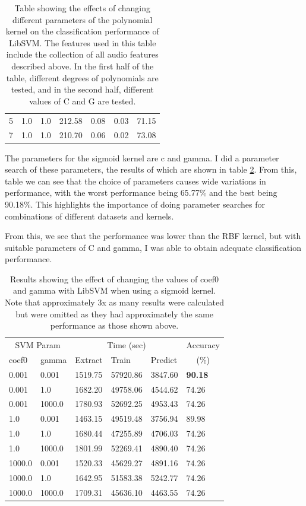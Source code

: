 \begin{table}
\begin{tabular}{|l|l|l|l|l|l|l|}
\hline
5  & 1.0    & 1.0     &  212.58  &  0.08  &  0.03  &  71.15  \\
7  & 1.0    & 1.0     &  210.70  &  0.06  &  0.02  &  73.08  \\
\hline
\end{tabular}
\caption{Table showing the effects of changing
  different parameters of the polynomial kernel on the classification
  performance of LibSVM.  The features used in this table include the
  collection of all audio features described above.  In the first half
  of the table, different degrees of polynomials are tested, and in
  the second half, different values of C and G are tested.}
\label{table:obv-libsvm-poly}
\end{table}

The parameters for the sigmoid kernel are c and gamma.  I did a
parameter search of these parameters, the results of which are shown
in table \ref{table:obv-libsvm-sigmoid}.  From this, table we can see
that the choice of parameters causes wide variations in performance,
with the worst performance being 65.77\% and the best being 90.18\%.
This highlights the importance of doing parameter searches for
combinations of different datasets and kernels.

From this, we see that the performance was lower than the RBF kernel,
but with suitable parameters of C and gamma, I was able to obtain
adequate classification performance.


\begin{table}
\begin{tabular}{|l|l|l|l|l|l|}
\hline
\multicolumn{2}{|c|}{SVM Param} & \multicolumn{3}{c|}{Time (sec)} & Accuracy \\
\hhline{|-|-|-|-|-|~|}
coef0 & gamma & Extract & Train & Predict & \multicolumn{1}{c|}{(\%)} \\
\hhline{|=|=|=|=|=|=|}
0.001  & 0.001   &  1519.75  &   57920.86  &  3847.60  &  \textbf{90.18}  \\
0.001  & 1.0     &  1682.20  &   49758.06  &  4544.62  &  74.26  \\
0.001  & 1000.0  &  1780.93  &   52692.25  &  4953.43  &  74.26  \\
1.0    & 0.001   &  1463.15  &   49519.48  &  3756.94  &  89.98  \\
1.0    & 1.0     &  1680.44  &   47255.89  &  4706.03  &  74.26  \\
1.0    & 1000.0  &  1801.99  &   52269.41  &  4890.40  &  74.26  \\
1000.0 & 0.001   &  1520.33  &   45629.27  &  4891.16  &  74.26  \\
1000.0 & 1.0     &  1642.95  &   51583.38  &  5242.77  &  74.26  \\
1000.0 & 1000.0  &  1709.31  &   45636.10  &  4463.55  &  74.26  \\
\hline
\end{tabular}
\caption{Results showing the effect of changing the values of coef0
  and gamma with LibSVM when using a sigmoid kernel. Note that
  approximately 3x as many results were calculated but were omitted as
  they had approximately the same performance as those shown above.}
\label{table:obv-libsvm-sigmoid}
\end{table}


